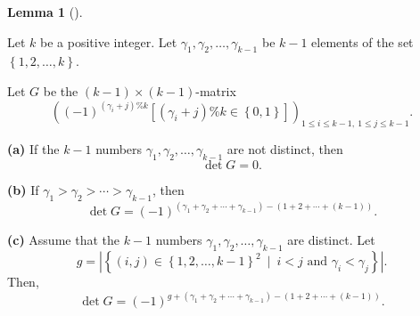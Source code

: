 \documentclass[numbers=enddot,12pt,final,onecolumn,notitlepage]{scrartcl}%
\theoremstyle{definition}
\newtheorem{lem}[theo]{Lemma}
\newenvironment{lemma}[1][]
{\begin{lem}[#1]\begin{leftbar}}
{\end{leftbar}\end{lem}}
\begin{document}
\begin{lemma}
\label{lem.petk.explicit.2}Let $k$ be a positive integer. Let $\gamma
_{1},\gamma_{2},\ldots,\gamma_{k-1}$ be $k-1$ elements of the set $\left\{
1,2,\ldots,k\right\}  $.

Let $G$ be the $\left(  k-1\right)  \times\left(  k-1\right)  $-matrix%
\[
\left(  \left(  -1\right)  ^{\left(  \gamma_{i}+j\right)  \%k}\left[  \left(
\gamma_{i}+j\right)  \%k\in\left\{  0,1\right\}  \right]  \right)  _{1\leq
i\leq k-1,\ 1\leq j\leq k-1}.
\]


\textbf{(a)} If the $k-1$ numbers $\gamma_{1},\gamma_{2},\ldots,\gamma_{k-1}$
are not distinct, then
\[
\det G=0.
\]


\textbf{(b)} If $\gamma_{1}>\gamma_{2}>\cdots>\gamma_{k-1}$, then%
\[
\det G=\left(  -1\right)  ^{\left(  \gamma_{1}+\gamma_{2}+\cdots+\gamma
_{k-1}\right)  -\left(  1+2+\cdots+\left(  k-1\right)  \right)  }.
\]


\textbf{(c)} Assume that the $k-1$ numbers $\gamma_{1},\gamma_{2}%
,\ldots,\gamma_{k-1}$ are distinct. Let%
\[
g=\left\vert \left\{  \left(  i,j\right)  \in\left\{  1,2,\ldots,k-1\right\}
^{2}\ \mid\ i<j\text{ and }\gamma_{i}<\gamma_{j}\right\}  \right\vert .
\]
Then,%
\[
\det G=\left(  -1\right)  ^{g+\left(  \gamma_{1}+\gamma_{2}+\cdots
+\gamma_{k-1}\right)  -\left(  1+2+\cdots+\left(  k-1\right)  \right)  }.
\]

\end{lemma}
\end{document}
